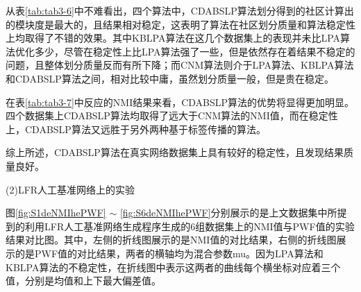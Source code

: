 从表\ref{tab:tab3-6}中不难看出，四个算法中，CDABSLP算法划分得到的社区计算出的模块度是最大的，且结果相对稳定，这表明了算法在社区划分质量和算法稳定性上均取得了不错的效果。其中KBLPA算法在这几个数据集上的表现并未比LPA算法优化多少，尽管在稳定性上比LPA算法强了一些，但是依然存在着结果不稳定的问题，且整体划分质量反而有所下降；而CNM算法则介于LPA算法、KBLPA算法和CDABSLP算法之间，相对比较中庸，虽然划分质量一般，但是贵在稳定。

在表\ref{tab:tab3-7}中反应的NMI结果来看，CDABSLP算法的优势将显得更加明显。四个数据集上CDABSLP算法均取得了远大于CNM算法的NMI值，而在稳定性上，CDABSLP算法又远胜于另外两种基于标签传播的算法。

综上所述，CDABSLP算法在真实网络数据集上具有较好的稳定性，且发现结果质量良好。

(2)LFR人工基准网络上的实验

图\ref{fig:S1deNMIhePWF} $\sim$ \ref{fig:S6deNMIhePWF}分别展示的是上文数据集中所提到的利用LFR人工基准网络生成程序生成的6组数据集上的NMI值与PWF值的实验结果对比图。其中，左侧的折线图展示的是NMI值的对比结果，右侧的折线图展示的是PWF值的对比结果，两者的横轴均为混合参数mu。因为LPA算法和KBLPA算法的不稳定性，在折线图中表示这两者的曲线每个横坐标对应着三个值，分别是均值和上下最大偏差值。

